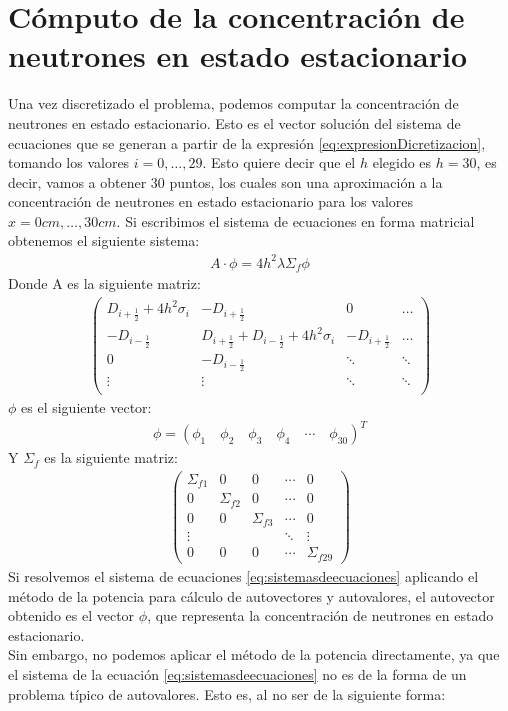 \documentclass[11pt,a4paper]{emulateapj}
\begin{document}
\section{Cómputo de la concentración de neutrones en estado estacionario}
\label{sec:computo}
Una vez discretizado el problema, podemos computar la concentración de neutrones en estado estacionario. Esto es el vector solución del sistema de ecuaciones que se generan a partir de la expresión \ref{eq:expresionDicretizacion}, tomando los valores $i = 0,\ldots,29$. Esto quiere decir que el $h$ elegido es $h=30$, es decir, vamos a obtener 30 puntos, los cuales son una aproximación a la concentración de neutrones en estado estacionario para los valores $x=0cm,\ldots,30cm$. Si escribimos el sistema de ecuaciones en forma matricial obtenemos el siguiente sistema:
\begin{eqnarray}
\label{eq:sistemasdeecuaciones}
A \cdot \phi = 4h^2 \lambda \Sigma_f \phi
\end{eqnarray}
Donde A es la siguiente matriz:
\begin{eqnarray}
\label{eqn:matrizA}
	 \left( \begin{array}{cccc}
		D_{i+\frac{1}{2}} + 4h^2\sigma_i & -D_{i+\frac{1}{2}}  					& 0 		&  \dots \\
		-D_{i-\frac{1}{2}} 		& D_{i+\frac{1}{2}} + D_{i-\frac{1}{2}} + 4h^2\sigma_i 	& -D_{i+\frac{1}{2}} &  \dots \\
		0 & -D_{i-\frac{1}{2}}& \ddots & \ddots \\
		\vdots &\vdots&\ddots&\ddots\\
		\end{array} 
	\right)
\end{eqnarray}
$\phi$ es el siguiente vector:
\begin{eqnarray}
\phi = (\phi_1 \quad \phi_2 \quad \phi_3 \quad \phi_4 \quad \cdots\quad \phi_{30} )^T
\end{eqnarray}
Y $\Sigma_f$ es la siguiente matriz:
\begin{eqnarray}
\label{eqn:matrizA}
	 \left( \begin{array}{ccccc}
		\Sigma_{f1} & 0 & 0 & \cdots & 0\\
		0 & \Sigma_{f2} & 0 &\cdots & 0\\
		0 & 0 & \Sigma_{f3} &\cdots & 0\\
		\vdots & & & \ddots & \vdots \\
		0 & 0 & 0 & \cdots & \Sigma_{f29}
		\end{array} 
	\right)
\end{eqnarray}
Si resolvemos el sistema de ecuaciones \ref{eq:sistemasdeecuaciones} aplicando el método de la potencia para cálculo de autovectores y autovalores, el autovector obtenido es el vector $\phi$, que representa la concentración de neutrones en estado estacionario. \\
Sin embargo, no podemos aplicar el método de la potencia directamente, ya que el sistema de la ecuación \ref{eq:sistemasdeecuaciones} no es de la forma de un problema típico de autovalores. Esto es, al no ser de la siguiente forma:
\end{document}
